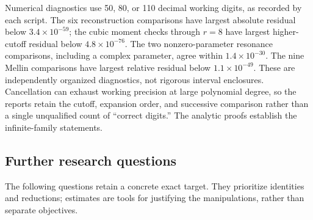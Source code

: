 \documentclass[11pt,letterpaper]{article}
\theoremstyle{definition}
\theoremstyle{remark}
\numberwithin{equation}{section}
\begin{document}
Numerical diagnostics use 50, 80, or 110 decimal working digits, as
recorded by each script. The six reconstruction comparisons have largest
absolute residual below $3.4\times10^{-59}$; the cubic moment checks
through $r=8$ have largest higher-cutoff residual below
$4.8\times10^{-76}$. The two nonzero-parameter resonance comparisons,
including a complex parameter, agree within $1.4\times10^{-30}$.
The nine Mellin comparisons have largest relative residual below
$1.1\times10^{-49}$. These are independently organized diagnostics,
not rigorous interval enclosures. Cancellation can exhaust working
precision at large polynomial degree, so the reports retain the cutoff,
expansion order, and successive comparison rather than a single
unqualified count of ``correct digits.'' The analytic proofs establish
the infinite-family statements.

\subsection{Further research questions}

The following questions retain a concrete exact target. They prioritize
identities and reductions; estimates are tools for justifying the
manipulations, rather than separate objectives.
\end{document}
